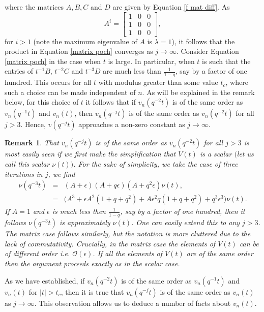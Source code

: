 \documentclass[a4paper,reqno]{amsart}
\numberwithin{equation}{section}
\newtheorem{remark}[theorem]{Remark}
\numberwithin{figure}{section}
\begin{document}
where the matrices $A,B,C$ and $D$ are given by Equation \eqref{f mat diff}. As 
\[ A^i = \begin{bmatrix}
   1 & 0 &0\\
   1&0&0 \\
   1&0&0
   \end{bmatrix} ,\]
for $i>1$ (note the maximum eigenvalue of $A$ is $\lambda=1$), it follows that the product in Equation \eqref{matrix poch} converges as $j\to\infty$. Consider Equation \eqref{matrix poch} in the case when $t$ is large. In particular, when $t$ is such that the entries of $t^{-1}B$, $t^{-2}C$ and $t^{-3}D$ are much less than $\frac{1}{1-q}$, say by a factor of one hundred. This occurs for all $t$ with modulus greater than some value $t_c$, where such a choice can be made independent of $n$. As will be explained in the remark below, for this choice of $t$ it follows that if $v_n(q^{-2}t)$ is of the same order as $v_n(q^{-1}t)$ and $v_n(t)$, then $v_n(q^{-j}t)$ is of the same order as $v_n(q^{-2}t)$ for all $j>3$. Hence, $v(q^{-j}t)$ approaches a non-zero constant as $j\to\infty$.
\begin{remark}\label{remark 4.1}
  That $v_n(q^{-j}t)$ is of the same order as $v_n(q^{-2}t)$ for all $j>3$ is most easily seen if we first make the simplification that $V(t)$ is a scalar $($let us call this scalar $\nu(t))$. For the sake of simplicity, we take the case of three iterations in $j$, we find
\begin{eqnarray*}
    \nu(q^{-3}t) &=& (A+\epsilon)(A+q\epsilon) (A+q^2\epsilon)\nu(t) ,\\
    &=& \Big(A^3 + \epsilon A^2(1+q+q^2) + A\epsilon^2q(1+q+q^2) + q^3\epsilon^3\Big)\nu(t).
\end{eqnarray*}
If $A=1$ and $\epsilon$ is much less then $\frac{1}{1-q}$, say by a factor of one hundred, then it follows $\nu(q^{-3}t)$ is approximately $\nu(t)$. One can easily extend this to any $j>3$. The matrix case follows similarly, but the notation is more cluttered due to the lack of commutativity. Crucially, in the matrix case the elements of $V(t)$ can be of different order i.e. $\mathcal{O}(\epsilon)$. If all the elements of $V(t)$ are of the same order then the argument proceeds exactly as in the scalar case. 
\end{remark}

As we have established, if $v_n(q^{-2}t)$ is of the same order as $v_n(q^{-1}t)$ and $v_n(t)$ for $|t|>t_c$, then it is true that $v_n(q^{-j}t)$ is of the same order as $v_n(t)$ as $j\to\infty$. This observation allows us to deduce a number of facts about $v_n(t)$. \\
\end{document}
